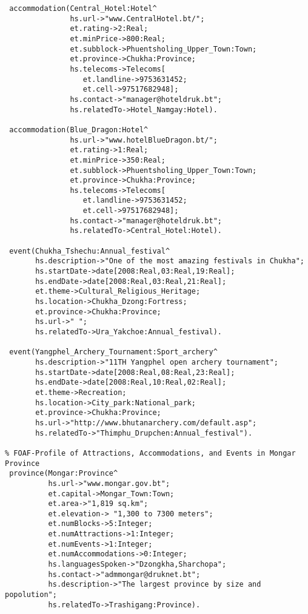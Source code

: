 \begin{verbatim}
 accommodation(Central_Hotel:Hotel^
               hs.url->"www.CentralHotel.bt/";
               et.rating->2:Real;
               et.minPrice->800:Real;
               et.subblock->Phuentsholing_Upper_Town:Town;
               et.province->Chukha:Province;
               hs.telecoms->Telecoms[
                  et.landline->9753631452;
                  et.cell->97517682948];
               hs.contact->"manager@hoteldruk.bt";
               hs.relatedTo->Hotel_Namgay:Hotel).                 
                  
 accommodation(Blue_Dragon:Hotel^
               hs.url->"www.hotelBlueDragon.bt/";
               et.rating->1:Real;
               et.minPrice->350:Real;
               et.subblock->Phuentsholing_Upper_Town:Town;
               et.province->Chukha:Province;
               hs.telecoms->Telecoms[
                  et.landline->9753631452;
                  et.cell->97517682948];
               hs.contact->"manager@hoteldruk.bt";
               hs.relatedTo->Central_Hotel:Hotel).
                  
 event(Chukha_Tshechu:Annual_festival^
       hs.description->"One of the most amazing festivals in Chukha";
       hs.startDate->date[2008:Real,03:Real,19:Real];
       hs.endDate->date[2008:Real,03:Real,21:Real];
       et.theme->Cultural_Religious_Heritage;
       hs.location->Chukha_Dzong:Fortress;
       et.province->Chukha:Province;
       hs.url->" ";
       hs.relatedTo->Ura_Yakchoe:Annual_festival).

 event(Yangphel_Archery_Tournament:Sport_archery^
       hs.description->"11TH Yangphel open archery tournament";
       hs.startDate->date[2008:Real,08:Real,23:Real];
       hs.endDate->date[2008:Real,10:Real,02:Real];
       et.theme->Recreation;
       hs.location->City_park:National_park;
       et.province->Chukha:Province;
       hs.url->"http://www.bhutanarchery.com/default.asp";
       hs.relatedTo->"Thimphu_Drupchen:Annual_festival").
                                 
% FOAF-Profile of Attractions, Accommodations, and Events in Mongar Province
 province(Mongar:Province^
          hs.url->"www.mongar.gov.bt";
          et.capital->Mongar_Town:Town;
          et.area->"1,819 sq.km";
          et.elevation-> "1,300 to 7300 meters";
          et.numBlocks->5:Integer;
          et.numAttractions->1:Integer;
          et.numEvents->1:Integer;
          et.numAccommodations->0:Integer;
          hs.languagesSpoken->"Dzongkha,Sharchopa";
          hs.contact->"admmongar@druknet.bt";
          hs.description->"The largest province by size and popolution";
          hs.relatedTo->Trashigang:Province).


\end{verbatim}
